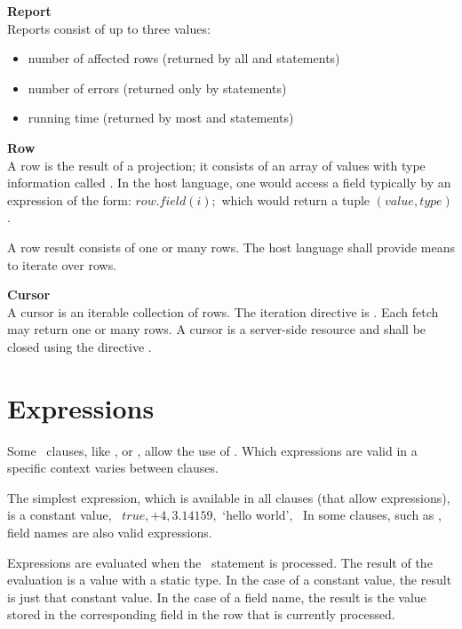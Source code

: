 \begin{minipage}{\textwidth}
\textbf{Report}\\
Reports consist of up to three values:
\begin{itemize}
\item number of affected rows
(returned by all  and  statements)
\item number of errors
(returned only by  statements)
\item running time
(returned by most  and  statements)
\end{itemize}
\end{minipage}

\begin{minipage}{\textwidth}
\textbf{Row}\\
A row is the result of a projection;
it consists of an array of values
with type information called .
In the host language, one would access a field
typically by an expression of the form:
$row.field(i);$
which would return a tuple $(value,type)$.

A row result consists of one or many rows.
The host language shall provide means
to iterate over rows.
\end{minipage}

\begin{minipage}{\textwidth}
\textbf{Cursor}\\
A cursor is an iterable collection of rows.
The iteration directive is .
Each fetch may return one or many rows.
A cursor is a server-side resource
and shall be closed using the directive .
\end{minipage}

\section{Expressions}
Some \sql\ clauses, like , 
 or ,
allow the use of .
Which expressions are valid 
in a specific context varies between
clauses.

The simplest expression,
which is available in all clauses
(that allow expressions),
is a constant value,
\eg\ $true, +4, 3.14159,$ `hello world', \etc\
In some clauses, such as ,
field names are also valid expressions.

Expressions are evaluated when the
\sql\ statement is processed.
The result of the evaluation is
a value with a static type.
In the case of a constant value,
the result is just that constant value.
In the case of a field name,
the result is the value stored in
the corresponding field in the
row that is currently processed.

